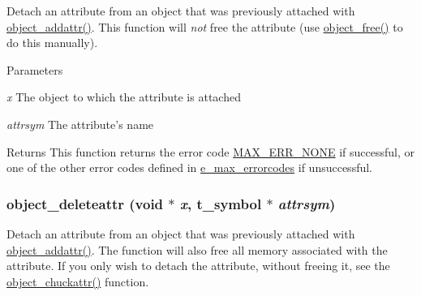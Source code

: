 Detach an attribute from an object that was previously attached with \hyperlink{group__attr_ga69d88788c952e914ecccd88179d0dfda}{object\_\-addattr()}. This function will {\itshape not\/} free the attribute (use \hyperlink{group__obj_ga3759846cb356195532c41e35b87522ee}{object\_\-free()} to do this manually).


\begin{DoxyParams}{Parameters}
\item[{\em x}]The object to which the attribute is attached \item[{\em attrsym}]The attribute's name\end{DoxyParams}
\begin{DoxyReturn}{Returns}
This function returns the error code \hyperlink{group__misc_gga0764dd6c02b76cca7d053ae50555d69da6d22f77fef8b1e1b074cef5d29d935fd}{MAX\_\-ERR\_\-NONE} if successful, or one of the other error codes defined in \hyperlink{group__misc_ga0764dd6c02b76cca7d053ae50555d69d}{e\_\-max\_\-errorcodes} if unsuccessful. 
\end{DoxyReturn}
\hypertarget{group__attr_gacd31a6e0c86bfeb6e1daf77576d86829}{
\subsubsection[{object\_\-deleteattr}]{ object\_\-deleteattr (void $\ast$ {\em x}, \/  {\bf t\_\-symbol} $\ast$ {\em attrsym})}}
\label{group__attr_gacd31a6e0c86bfeb6e1daf77576d86829}


Detach an attribute from an object that was previously attached with \hyperlink{group__attr_ga69d88788c952e914ecccd88179d0dfda}{object\_\-addattr()}. The function will also free all memory associated with the attribute. If you only wish to detach the attribute, without freeing it, see the \hyperlink{group__attr_gad1d2497a054fa297defd47d57aef216c}{object\_\-chuckattr()} function.


